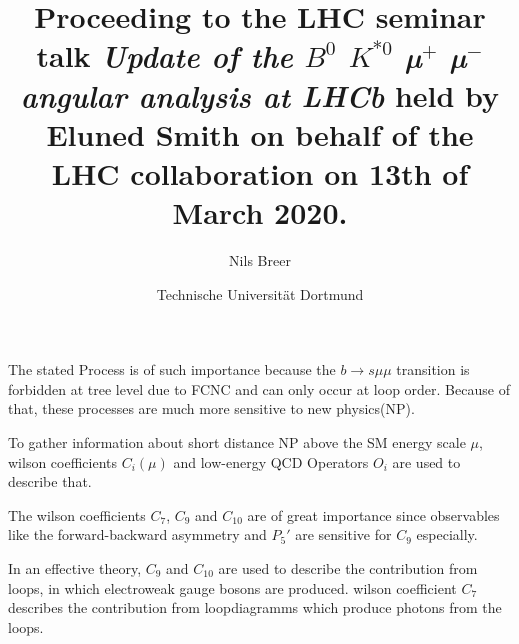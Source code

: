


\setlength{\oddsidemargin}{0.0 cm}
\setlength{\evensidemargin}{0.0 cm}
\setlength{\topmargin}{-1cm}
\setlength{\textheight}{24 cm}
\setlength{\textwidth}{16 cm}

\pagestyle{plain}

\setlength{\parindent}{0in}



\author{Nils Breer}
\date{Technische Universit\"at Dortmund}

\title{Proceeding to the LHC seminar talk \textit{Update of the $B^0$ \to $K^{*0}$ µ$^{+}$ µ$^{-}$ angular analysis at LHCb} held by Eluned Smith on behalf of the LHC collaboration on 13th of March 2020.}

\maketitle


The stated Process is of such importance because the
$b \to s \mu \mu$ transition is forbidden at tree level due to FCNC and can only occur at loop order.
Because of that, these processes are much more sensitive to new physics(NP).

%

To gather information about short distance NP above the SM energy scale $\mu$, wilson coefficients $C_i(\mu)$ and low-energy QCD Operators $O_i$ are used to describe that.

The wilson coefficients $C_7$, $C_9$ and $C_{10}$ are of great importance since observables like the forward-backward asymmetry and $P_5\prime$ are sensitive for $C_9$ especially.

In an effective theory, $C_9$ and $C_{10}$ are used to describe the contribution from loops, in which electroweak gauge bosons are produced.  wilson coefficient $C_7$ describes the contribution from loopdiagramms which produce photons from the loops.

